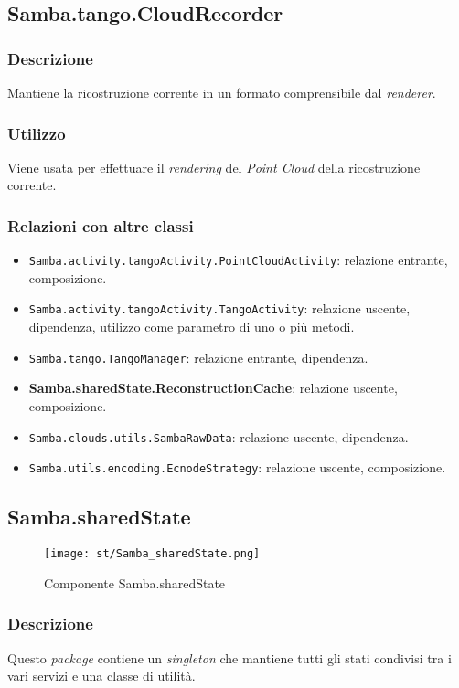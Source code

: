\subsection{Samba.tango.CloudRecorder}
\subsubsection{Descrizione}
Mantiene la ricostruzione corrente in un formato comprensibile dal \emph{renderer}.
\subsubsection{Utilizzo}
Viene usata per effettuare il \emph{rendering} del \emph{Point Cloud} della ricostruzione corrente.
\subsubsection{Relazioni con altre classi}
\begin{itemize}
	\item \texttt{Samba.activity.tangoActivity.PointCloudActivity}: relazione entrante, composizione.
	\item \texttt{Samba.activity.tangoActivity.TangoActivity}: relazione uscente, dipendenza, utilizzo come parametro di uno o più metodi.
	\item \texttt{Samba.tango.TangoManager}: relazione entrante, dipendenza.
	\item \textbf{Samba.sharedState.ReconstructionCache}: relazione uscente, composizione.
	\item \texttt{Samba.clouds.utils.SambaRawData}: relazione uscente, dipendenza.
	\item \texttt{Samba.utils.encoding.EcnodeStrategy}: relazione uscente, composizione.
\end{itemize}


\subsection{Samba.sharedState}
\begin{figure}[!h] 
    \centering 
    \texttt{[image: st/Samba\_sharedState.png]} 
    \caption{Componente Samba.sharedState}
\end{figure}
\subsubsection{Descrizione}
Questo \emph{package} contiene un \emph{singleton} che mantiene tutti gli stati condivisi tra i vari servizi e una classe di utilità.

